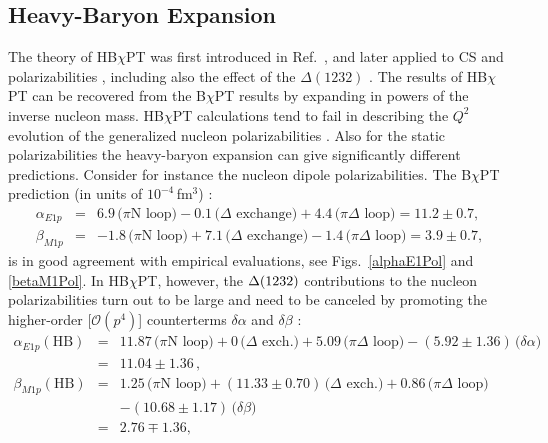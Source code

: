 \documentclass[preprints,review,accept,moreauthors,pdftex]{Definitions/mdpi}
\def\bea{\begin{eqnarray}}
\def\eea{\end{eqnarray}}
\def\eqlab#1{\label{eq:#1}}
\def\nn{\nonumber}
\begin{document}
\subsection{Heavy-Baryon Expansion}\label{secHB}

The theory of HB$\chi$PT  was first introduced in Ref.~\cite{Jenkins:1990jv}, and later applied to CS and polarizabilities \cite{Butler:1992ci}, including also the effect of the $\Delta(1232)$ \cite{Bernard:1995dp,Hemmert:1996rw,Hildebrandt:2003fm,Griesshammer:2012we,Kao:2002cp,Kao:2003jd,Nevado:2007dd}. The results of HB$\chi$PT can be recovered from the B$\chi$PT results by expanding in powers of the inverse nucleon mass. HB$\chi$PT calculations tend to fail in describing the $Q
^2$ evolution of the generalized nucleon polarizabilities \cite{Alarcon:2020icz,Alarcon:2020wjg}. 
Also for the static polarizabilities the heavy-baryon expansion can give significantly different predictions. Consider for instance the nucleon dipole polarizabilities. The B$\chi$PT prediction (in units of $10^{-4}\,$fm$^3$) \cite{Lensky:2015awa}:
\begin{subequations}
\begin{eqnarray}
\eqlab{alChPT}
 \alpha_{E1p}&=& 6.9\,\mbox{($\pi$N loop)} -0.1\,\mbox{($\Delta$ exchange)} + 4.4\, \mbox{($\pi\Delta$ loop)} = 11.2\pm 0.7,\\
\beta_{M1p}&=&-1.8\,\mbox{($\pi$N loop)} + 7.1\,\mbox{($\Delta$ exchange)}-1.4\, \mbox{($\pi\Delta$ loop)} =3.9\pm 0.7,
\end{eqnarray}
\end{subequations}
is in good agreement with empirical evaluations, see Figs.~\ref{alphaE1Pol} and \ref{betaM1Pol}.
In HB$\chi$PT, however, the $\Delta(1232)$ contributions
to the nucleon polarizabilities turn out to be large \cite{Hemmert:1996rw}
and need to be canceled by promoting the higher-order [$\mathcal{O}(p^4)$] counterterms $\delta \alpha$ and $\delta \beta$  \cite{Hildebrandt:2003fm}:
\begin{subequations}
\eqlab{abHBChPT}
\bea 
  \alpha_{E1p}(\mbox{HB}) &=& 11.87 \,\mbox{($\pi$N loop)} + 0 \,\mbox{($\Delta$ exch.)} + 5.09 \, \mbox{($\pi\Delta$ loop)} -(5.92\pm 1.36)\, \mbox{($\delta \alpha$)} \nn\\
  &=& 11.04\pm1.36\,,\\
 \beta_{M1p}(\mbox{HB})&=& 1.25 \,\mbox{($\pi$N loop)}  
 + (11.33\pm 0.70) \,\mbox{($\Delta$ exch.)} +0.86\,  \mbox{($\pi\Delta$ loop)}\\
 &&-(10.68\pm 1.17)\, \mbox{($\delta \beta$)}\qquad\nn \\
  &=&  2.76\mp 1.36,
\eea 
\end{subequations}
\end{document}
